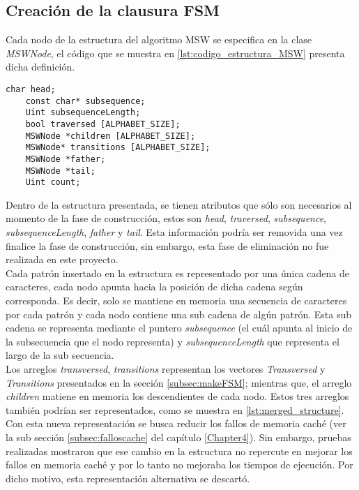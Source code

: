 \subsection{Creación de la clausura FSM}
\label{subsec:implfsm}
Cada nodo de la estructura del algoritmo MSW se especifica en la clase {\it MSWNode}, el código que se muestra en \ref{lst:codigo_estructura_MSW} presenta dicha definición.
\begin{lstlisting}[caption=Representación de los nodos en MSW, label={lst:codigo_estructura_MSW}]
    char head;
    const char* subsequence;
    Uint subsequenceLength;
    bool traversed [ALPHABET_SIZE];
    MSWNode *children [ALPHABET_SIZE];
    MSWNode* transitions [ALPHABET_SIZE];
    MSWNode *father;
    MSWNode *tail;
    Uint count;
\end{lstlisting}
Dentro de la estructura presentada, se tienen atributos que sólo son necesarios al momento de la fase de construcción, estos son {\it head}, {\it traversed}, {\it subsequence}, {\it subsequenceLength}, {\it father} y {\it tail}. Esta información podría ser removida una vez finalice la fase de construcción, sin embargo, esta fase de eliminación no fue realizada en este proyecto.\\ 
Cada patrón insertado en la estructura es representado por una única cadena de caracteres, cada nodo apunta hacia la posición de dicha cadena según corresponda. Es decir, solo se mantiene en memoria una secuencia de caracteres por cada patrón y cada nodo contiene una sub cadena de algún patrón. Esta sub cadena se representa mediante el puntero {\it subsequence} (el cuál apunta al inicio de la subsecuencia que el nodo representa) y {\it subsequenceLength} que representa el largo de la sub secuencia.\\
Los arreglos {\it transversed}, {\it transitions} representan los vectores {\it Transversed} y {\it Transitions} presentados en la sección \ref{subsec:makeFSM}; mientras que, el arreglo {\it children} matiene en memoria los descendientes de cada nodo. Estos tres arreglos también podrían ser representados, como se muestra en \ref{lst:merged_structure}. Con esta nueva representación se busca reducir los fallos de memoria caché (ver la sub sección \ref{subsec:falloscache} del capítulo \ref{Chapter4}). Sin embargo, pruebas realizadas mostraron que ese cambio en la estructura no repercute en mejorar los fallos en memoria caché y por lo tanto no mejoraba los tiempos de ejecución. Por dicho motivo, esta representación alternativa se descartó.\\

